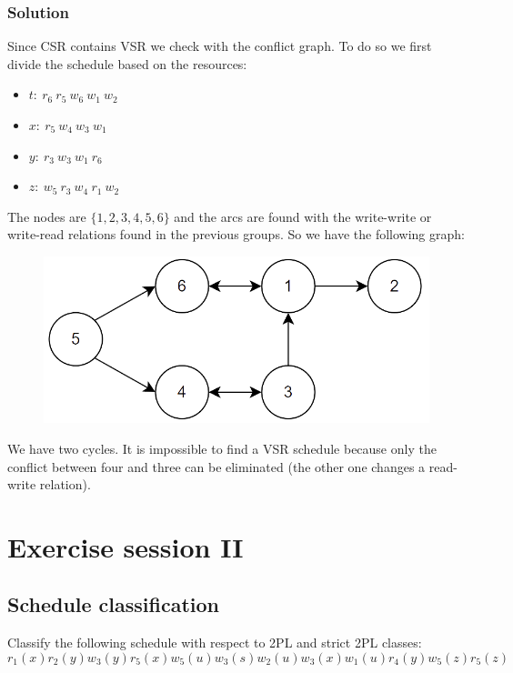 \documentclass[12pt, a4paper]{report}
\newtheorem[style=M,bodystyle=\normalfont]{theorem}{Theorem}
\newtheorem[style=M,bodystyle=\normalfont]{corollary}{Corollary}
\newtheorem[style=M,bodystyle=\normalfont]{lemma}{Lemma}
\newtheorem[style=M,bodystyle=\normalfont]{definition}{Definition}
\begin{document}
    \subsection*{Solution}
        Since CSR contains VSR we check with the conflict graph. To do so we first divide the schedule based on the resources: 
        \begin{itemize}
            \item $t: \: r_6 \: r_5 \: w_6 \: w_1 \: w_2$
            \item $x: \: r_5 \: w_4 \: w_3 \: w_1$
            \item $y: \: r_3 \: w_3 \: w_1 \: r_6$
            \item $z: \: w_5 \: r_3 \: w_4 \: r_1 \: w_2$
        \end{itemize}
        The nodes are $\{1,2,3,4,5,6\}$ and the arcs are found with the write-write or write-read relations found in the previous groups. So we have the following graph:
        \begin{figure}[H]
            \centering
            \includegraphics[width=0.5\linewidth]{images/conflictgraph3.png}
        \end{figure}
        We have two cycles. It is impossible to find a VSR schedule because only the conflict between four and three can be eliminated (the other one changes a read-write relation).

    \newpage

    \chapter{Exercise session II}
    \section{Schedule classification}
        Classify the following schedule with respect to 2PL and strict 2PL classes: 
        \[r_1(x) r_2(y) w_3(y) r_5(x) w_5(u) w_3(s) w_2(u) w_3(x) w_1(u) r_4(y) w_5(z) r_5(z)\]
\end{document}

